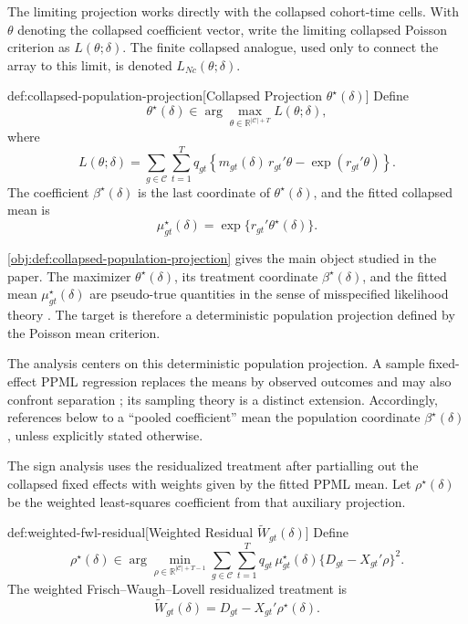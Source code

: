 \documentclass[11pt]{article}
\begin{document}
The limiting projection works directly with the collapsed cohort-time cells. With \(\theta\) denoting the collapsed coefficient vector, write the limiting collapsed Poisson criterion as \(L(\theta;\delta)\). The finite collapsed analogue, used only to connect the array to this limit, is denoted \(L_{Nc}(\theta;\delta)\).

\begin{definitionv}{def:collapsed-population-projection}[Collapsed Projection \(\theta^\star(\delta)\)]
Define
\[
\theta^\star(\delta)\in
\arg\max_{\theta\in\mathbb R^{|\mathcal C|+T}} L(\theta;\delta),
\]
where
\[
L(\theta;\delta)
=
\sum_{g\in\mathcal C}\sum_{t=1}^T
q_{gt}
\left\{
m_{gt}(\delta)\,r_{gt}'\theta-\exp(r_{gt}'\theta)
\right\}.
\]
The coefficient \(\beta^\star(\delta)\) is the last coordinate of \(\theta^\star(\delta)\), and the fitted collapsed mean is
\[
\mu^\star_{gt}(\delta)=\exp\{r_{gt}'\theta^\star(\delta)\}.
\]
\end{definitionv}

\cref{obj:def:collapsed-population-projection} gives the main object studied in the paper. The maximizer \(\theta^\star(\delta)\), its treatment coordinate \(\beta^\star(\delta)\), and the fitted mean \(\mu^\star_{gt}(\delta)\) are pseudo-true quantities in the sense of misspecified likelihood theory \citep{White1982MisspecifiedML,GourierouxMonfortTrognon1984Theory,GourierouxMonfortTrognon1984Poisson}. The target is therefore a deterministic population projection defined by the Poisson mean criterion.

The analysis centers on this deterministic population projection. A sample fixed-effect PPML regression replaces the means by observed outcomes and may also confront separation \citep{SantosSilvaTenreyro2006,SantosSilvaTenreyro2011,CorreiaGuimaraesZylkin2020}; its sampling theory is a distinct extension. Accordingly, references below to a ``pooled coefficient'' mean the population coordinate \(\beta^\star(\delta)\), unless explicitly stated otherwise.

The sign analysis uses the residualized treatment after partialling out the collapsed fixed effects with weights given by the fitted PPML mean. Let \(\rho^\star(\delta)\) be the weighted least-squares coefficient from that auxiliary projection.

\begin{definitionv}{def:weighted-fwl-residual}[Weighted Residual \(\widetilde W_{gt}(\delta)\)]
Define
\[
\rho^\star(\delta)
\in
\arg\min_{\rho\in\mathbb R^{|\mathcal C|+T-1}}
\sum_{g\in\mathcal C}\sum_{t=1}^T
q_{gt}\,\mu^\star_{gt}(\delta)\{D_{gt}-X_{gt}'\rho\}^2.
\]
The weighted Frisch--Waugh--Lovell residualized treatment is
\[
\widetilde W_{gt}(\delta)=D_{gt}-X_{gt}'\rho^\star(\delta).
\]
\end{definitionv}
\end{document}
